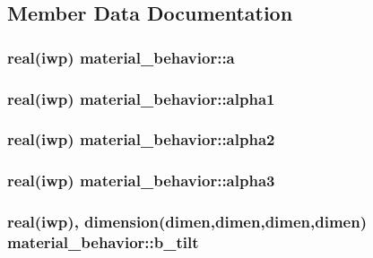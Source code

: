\subsection{Member Data Documentation}
\hypertarget{classmaterial__behavior_a7d56504ef4329ab65c4fc86cd108beb4}{}
\subsubsection[{a}]{\setlength{\rightskip}{0pt plus 5cm}real(iwp) material\+\_\+behavior\+::a}\label{classmaterial__behavior_a7d56504ef4329ab65c4fc86cd108beb4}
\hypertarget{classmaterial__behavior_a0cc1fdb0277dc79da5dfebd44dc2d0df}{}
\subsubsection[{alpha1}]{\setlength{\rightskip}{0pt plus 5cm}real(iwp) material\+\_\+behavior\+::alpha1}\label{classmaterial__behavior_a0cc1fdb0277dc79da5dfebd44dc2d0df}
\hypertarget{classmaterial__behavior_a64f16b5401dd56a6ccfaaf8583574f6d}{}
\subsubsection[{alpha2}]{\setlength{\rightskip}{0pt plus 5cm}real(iwp) material\+\_\+behavior\+::alpha2}\label{classmaterial__behavior_a64f16b5401dd56a6ccfaaf8583574f6d}
\hypertarget{classmaterial__behavior_a70c3b833853f5d5fc20f72c0bd0cee34}{}
\subsubsection[{alpha3}]{\setlength{\rightskip}{0pt plus 5cm}real(iwp) material\+\_\+behavior\+::alpha3}\label{classmaterial__behavior_a70c3b833853f5d5fc20f72c0bd0cee34}
\hypertarget{classmaterial__behavior_a09bea0d09d129357d5ddd0c3173b5810}{}
\subsubsection[{b\+\_\+tilt}]{\setlength{\rightskip}{0pt plus 5cm}real(iwp), dimension(dimen,dimen,dimen,dimen) material\+\_\+behavior\+::b\+\_\+tilt}\label{classmaterial__behavior_a09bea0d09d129357d5ddd0c3173b5810}
\hypertarget{classmaterial__behavior_a99816d6be4ed7244881e685956b7ac06}{}

